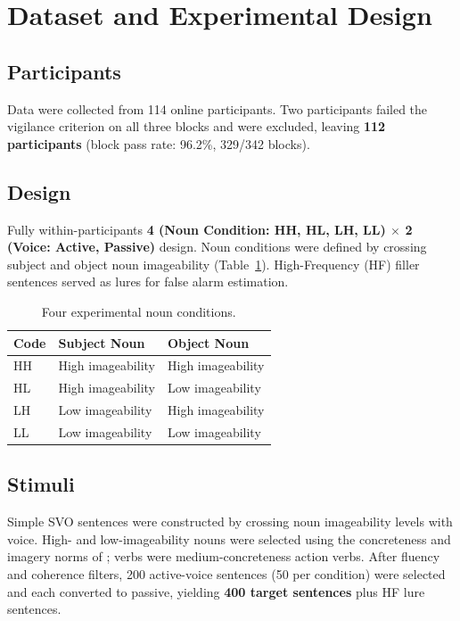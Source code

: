 \documentclass[12pt, a4paper]{article}
\begin{document}
\section{Dataset and Experimental Design}

\subsection{Participants}

Data were collected from 114 online participants. Two participants failed
the vigilance criterion on all three blocks and were excluded, leaving
\textbf{112 participants} (block pass rate: 96.2\%, 329/342 blocks).

\subsection{Design}

Fully within-participants \textbf{4 (Noun Condition: HH, HL, LH, LL)
$\times$ 2 (Voice: Active, Passive)} design. Noun conditions were defined
by crossing subject and object noun imageability (Table~\ref{tab:conditions}).
High-Frequency (HF) filler sentences served as lures for false alarm
estimation.

\begin{table}[htbp]
  \centering\small
  \begin{tabular}{lll}
    \toprule
    \textbf{Code} & \textbf{Subject Noun} & \textbf{Object Noun} \\
    \midrule
    HH & High imageability & High imageability \\
    HL & High imageability & Low imageability  \\
    LH & Low imageability  & High imageability \\
    LL & Low imageability  & Low imageability  \\
    \bottomrule
  \end{tabular}
  \caption{Four experimental noun conditions.}
  \label{tab:conditions}
\end{table}

\subsection{Stimuli}

Simple SVO sentences were constructed by crossing noun imageability
levels with voice. High- and low-imageability nouns were selected using
the concreteness and imagery norms of \citet{paivio1968}; verbs were
medium-concreteness action verbs. After fluency and coherence filters,
200 active-voice sentences (50 per condition) were selected and each
converted to passive, yielding \textbf{400 target sentences} plus HF
lure sentences.
\end{document}
